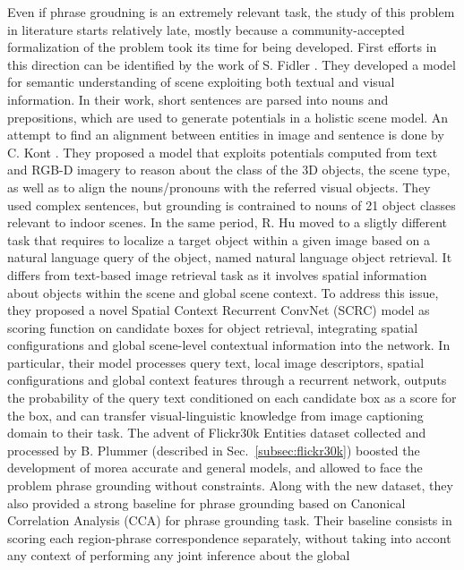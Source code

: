 Even if phrase groudning is an extremely relevant task, the study of
this problem in literature starts relatively late, mostly because a
community-accepted formalization of the problem took its time for
being developed. First efforts in this direction can be identified by
the work of S. Fidler \etal{} \cite{fidler2013sentence}. They
developed a model for semantic understanding of scene exploiting both
textual and visual information. In their work, short sentences are
parsed into nouns and prepositions, which are used to generate
potentials in a holistic scene model. An attempt to find an alignment
between entities in image and sentence is done by C. Kont \etal{}
\cite{kong2014you}. They proposed a model that exploits potentials
computed from text and RGB-D imagery to reason about the class of the
3D objects, the scene type, as well as to align the nouns/pronouns
with the referred visual objects. They used complex sentences, but
grounding is contrained to nouns of 21 object classes relevant to
indoor scenes. In the same period, R. Hu \etal{} \cite{hu2016natural}
moved to a sligtly different task that requires to localize a target
object within a given image based on a natural language query of the
object, named natural language object retrieval. It differs from
text-based image retrieval task as it involves spatial information
about objects within the scene and global scene context. To address
this issue, they proposed a novel Spatial Context Recurrent ConvNet
(SCRC) model as scoring function on candidate boxes for object
retrieval, integrating spatial configurations and global scene-level
contextual information into the network. In particular, their model
processes query text, local image descriptors, spatial configurations
and global context features through a recurrent network, outputs the
probability of the query text conditioned on each candidate box as a
score for the box, and can transfer visual-linguistic knowledge from
image captioning domain to their task. The advent of Flickr30k
Entities dataset collected and processed by B. Plummer \etal{}
\cite{plummer2015flickr30k} (described in Sec.~\ref{subsec:flickr30k})
boosted the development of morea accurate and general models, and
allowed to face the problem phrase grounding without constraints.
Along with the new dataset, they also provided a strong baseline for
phrase grounding based on Canonical Correlation Analysis (CCA) for
phrase grounding task. Their baseline consists in scoring each
region-phrase correspondence separately, without taking into accont
any context of performing any joint inference about the global
